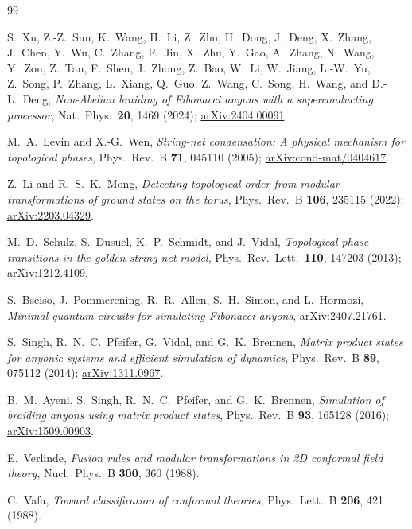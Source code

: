 \documentclass[aps,pra,twocolumn,superscriptaddress,longbibliography,floatfix,nofootinbib]{revtex4-2}
\begin{document}
\begin{thebibliography}{99}

S.~Xu, Z.-Z.~Sun, K.~Wang, H.~Li, Z.~Zhu, H.~Dong, J.~Deng, X.~Zhang, J.~Chen,
Y.~Wu, C.~Zhang, F.~Jin, X.~Zhu, Y.~Gao, A.~Zhang, N.~Wang, Y.~Zou, Z.~Tan,
F.~Shen, J.~Zhong, Z.~Bao, W.~Li, W.~Jiang, L.-W.~Yu, Z.~Song, P.~Zhang,
L.~Xiang, Q.~Guo, Z.~Wang, C.~Song, H.~Wang, and D.-L.~Deng,
\emph{Non-Abelian braiding of Fibonacci anyons with a superconducting
processor},
Nat.\ Phys.\ \textbf{20}, 1469 (2024);
\href{https://arxiv.org/abs/2404.00091}{arXiv:2404.00091}.

M.~A.~Levin and X.-G.~Wen,
\emph{String-net condensation: A physical mechanism for topological phases},
Phys.\ Rev.\ B \textbf{71}, 045110 (2005);
\href{https://arxiv.org/abs/cond-mat/0404617}{arXiv:cond-mat/0404617}.

Z.~Li and R.~S.~K.~Mong,
\emph{Detecting topological order from modular transformations of ground states
on the torus},
Phys.\ Rev.\ B \textbf{106}, 235115 (2022);
\href{https://arxiv.org/abs/2203.04329}{arXiv:2203.04329}.

M.~D.~Schulz, S.~Dusuel, K.~P.~Schmidt, and J.~Vidal,
\emph{Topological phase transitions in the golden string-net model},
Phys.\ Rev.\ Lett.\ \textbf{110}, 147203 (2013);
\href{https://arxiv.org/abs/1212.4109}{arXiv:1212.4109}.

S.~Bseiso, J.~Pommerening, R.~R.~Allen, S.~H.~Simon, and L.~Hormozi,
\emph{Minimal quantum circuits for simulating Fibonacci anyons},
\href{https://arxiv.org/abs/2407.21761}{arXiv:2407.21761}.

S.~Singh, R.~N.~C.~Pfeifer, G.~Vidal, and G.~K.~Brennen,
\emph{Matrix product states for anyonic systems and efficient simulation of
dynamics},
Phys.\ Rev.\ B \textbf{89}, 075112 (2014);
\href{https://arxiv.org/abs/1311.0967}{arXiv:1311.0967}.

B.~M.~Ayeni, S.~Singh, R.~N.~C.~Pfeifer, and G.~K.~Brennen,
\emph{Simulation of braiding anyons using matrix product states},
Phys.\ Rev.\ B \textbf{93}, 165128 (2016);
\href{https://arxiv.org/abs/1509.00903}{arXiv:1509.00903}.

E.~Verlinde,
\emph{Fusion rules and modular transformations in 2D conformal field theory},
Nucl.\ Phys.\ B \textbf{300}, 360 (1988).

C.~Vafa,
\emph{Toward classification of conformal theories},
Phys.\ Lett.\ B \textbf{206}, 421 (1988).


\end{thebibliography}
\end{document}
